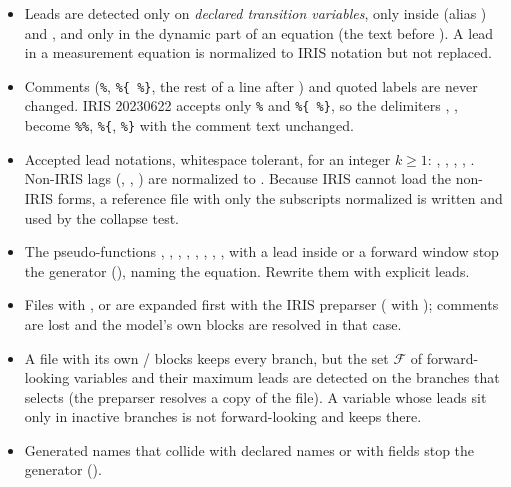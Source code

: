 \documentclass[11pt,a4paper]{article}
\begin{document}
\begin{itemize}
  \item Leads are detected only on \emph{declared transition variables}, only inside
         (alias ) and , and
        only in the dynamic part of an equation (the text before \code{!!}). A lead in a
        measurement equation is normalized to IRIS notation but not replaced.
  \item Comments (\texttt{\%}, \texttt{\%\{ \%\}}, the rest of a line after ) and
        quoted labels are never changed. IRIS 20230622 accepts only \texttt{\%} and
        \texttt{\%\{ \%\}}, so the delimiters \code{//}, \code{/*}, \code{*/} become
        \texttt{\%\%}, \texttt{\%\{}, \texttt{\%\}} with the comment text unchanged.
  \item Accepted lead notations, whitespace tolerant, for an integer $k\ge 1$:
        , , , , . Non-IRIS lags
        (, , ) are normalized to . Because IRIS
        cannot load the non-IRIS forms, a reference file  with only the
        subscripts normalized is written and used by the collapse test.
  \item The pseudo-functions , , , , ,
        , , ,  with a lead inside or a
        forward window stop the generator (), naming the
        equation. Rewrite them with explicit leads.
  \item Files with ,  or  are expanded first with the
        IRIS preparser ( with ); comments are lost
        and the model's own  blocks are resolved in that case.
  \item A file with its own / blocks keeps every branch, but the set
        $\mathcal{F}$ of forward-looking variables and their maximum leads are detected on the
        branches that  selects (the preparser resolves a copy of the file).
        A variable whose leads sit only in inactive branches is not forward-looking and keeps
         there.
  \item Generated names that collide with declared names or with  fields stop
        the generator ().
\end{itemize}
\end{document}
